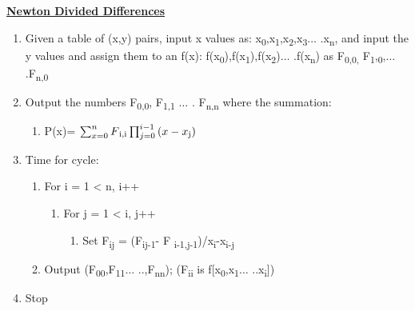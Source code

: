 \documentclass[12pt]{article}
\renewcommand{\_}{\kern-1.5pt\textunderscore\kern-1.5pt}
\begin{document}
\textbf{\uline{Newton Divided Differences }}\par


\vspace{\baselineskip}
\begin{enumerate}
	\item Given a table of (x,y) pairs, input x values as: x\textsubscript{0},x\textsubscript{1},x\textsubscript{2},x\textsubscript{3}$ \ldots $ .x\textsubscript{n}, and input the y values and assign them to an f(x):  f(x\textsubscript{0}),f(x\textsubscript{1}),f(x\textsubscript{2})$ \ldots $ .f(x\textsubscript{n}) as F\textsubscript{0,0, }F\textsubscript{1},\textsubscript{0},$ \ldots $ .F\textsubscript{n,0}\par

	\item Output the numbers F\textsubscript{0,0}, F\textsubscript{1,1 }$ \ldots $ . F\textsubscript{n,n }where the summation: \par

\begin{enumerate}
	\item P(x)=  \(  \sum _{x=0}^{n}F\textsubscript{i,i} \prod_{j=0}^{i-1} \left( x-x\textsubscript{j} \right)  \) \par


\end{enumerate}
	\item Time for cycle:\par

\begin{enumerate}
	\item For i = 1 < n, i++\par

\begin{enumerate}
	\item For j = 1 < i, j++ \par

\begin{enumerate}
	\item Set F\textsubscript{ij} = (F\textsubscript{ij-1}- F \textsubscript{i-1,j-1})/x\textsubscript{i}-x\textsubscript{i-j}\par


\end{enumerate}
\end{enumerate}
	\item Output (F\textsubscript{00},F\textsubscript{11}$ \ldots $ ..,F\textsubscript{nn}); (F\textsubscript{ii }is f[x\textsubscript{0},x\textsubscript{1}$ \ldots $ ..x\textsubscript{i}])\par


\end{enumerate}
	\item Stop 
\end{enumerate}\par


\printbibliography
\end{document}
